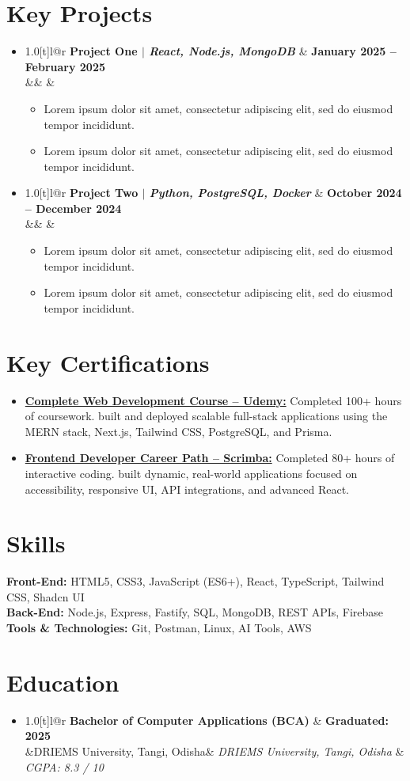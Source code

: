 \documentclass[letterpaper,11pt]{article}
\makeatletter
\newcommand{\resumeItem}[1]{\item\small{{#1 \vspace{-2pt}}}}
\newcommand{\resumeSubheading}[4]{
  \vspace{-2pt}\item
    \begin{tabular*}{1.0\textwidth}[t]{l@{\extracolsep{\fill}}r}
      \textbf{#1} & \textbf{\small #2} \\
      \ifx&#3&%
      \else
        \textit{\small #3} & \textit{\small #4} \\
      \fi
    \end{tabular*}\vspace{-6pt}
}
\newcommand{\resumeItemListStart}{\begin{itemize}}
\newcommand{\resumeItemListEnd}{\end{itemize}\vspace{-5pt}}
\newcommand{\resumeSubHeadingListStart}{\begin{itemize}[leftmargin=0.0in, label={}]}
\newcommand{\resumeSubHeadingListEnd}{\end{itemize}}
\makeatother
\begin{document}
\section{Key Projects}
\resumeSubHeadingListStart
  \resumeSubheading
    {\textbf{Project One} $|$ {\normalfont\textit{React, Node.js, MongoDB}}}{January 2025 -- February 2025}
    {}{}
    \resumeItemListStart
      \resumeItem{Lorem ipsum dolor sit amet, consectetur adipiscing elit, sed do eiusmod tempor incididunt.}
      \resumeItem{Lorem ipsum dolor sit amet, consectetur adipiscing elit, sed do eiusmod tempor incididunt.}
    \resumeItemListEnd
  \resumeSubheading
    {\textbf{Project Two} $|$ {\normalfont\textit{Python, PostgreSQL, Docker}}}{October 2024 -- December 2024}
    {}{}
    \resumeItemListStart
      \resumeItem{Lorem ipsum dolor sit amet, consectetur adipiscing elit, sed do eiusmod tempor incididunt.}
      \resumeItem{Lorem ipsum dolor sit amet, consectetur adipiscing elit, sed do eiusmod tempor incididunt.}
    \resumeItemListEnd
\resumeSubHeadingListEnd

\section{Key Certifications}
\resumeSubHeadingListStart
  \resumeItem{\href{https://www.udemy.com/certificate/UC-689a510e-ba1f-4bde-a747-4dcb60be473f/}{\textbf{Complete Web Development Course -- Udemy:}} Completed 100+ hours of coursework. built and deployed scalable full-stack applications using the MERN stack, Next.js, Tailwind CSS, PostgreSQL, and Prisma.}
  \vspace{-5pt}
  \resumeItem{\href{https://scrimba.com/certificate-cert2uNjfK9m1uNZ5v8RvYFqLcn2NxZ2keLE9bE}{\textbf{Frontend Developer Career Path -- Scrimba:}} Completed 80+ hours of interactive coding. built dynamic, real-world applications focused on accessibility, responsive UI, API integrations, and advanced React.}
\resumeSubHeadingListEnd

\section{Skills}
\textbf{Front-End:} HTML5, CSS3, JavaScript (ES6+), React, TypeScript, Tailwind CSS, Shadcn UI \\
\textbf{Back-End:} Node.js, Express, Fastify, SQL, MongoDB, REST APIs, Firebase \\
\textbf{Tools \& Technologies:} Git, Postman, Linux, AI Tools, AWS

\section{Education}
\resumeSubHeadingListStart
  \resumeSubheading
    {Bachelor of Computer Applications (BCA)}{Graduated: 2025}
    {DRIEMS University, Tangi, Odisha}{CGPA: 8.3 / 10}
\resumeSubHeadingListEnd
\end{document}
